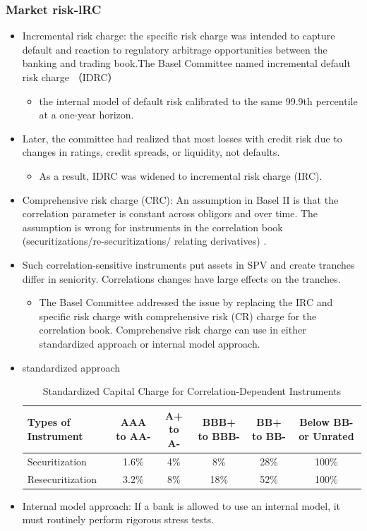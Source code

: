 \subsubsection{Market risk-lRC}
\begin{itemize}
\item Incremental risk charge: the specific risk charge was intended to capture default and reaction to regulatory arbitrage opportunities between the banking and trading book.The Basel Committee named incremental default risk charge （IDRC）

    \begin{itemize}
    \item the internal model of default risk calibrated to the same 99.9th percentile at a one-year horizon.
    \end{itemize}

\item Later, the committee had realized that most losses with credit risk due to changes in ratings, credit spreads, or liquidity, not defaults.
    \begin{itemize}
    \item As a result, IDRC was widened to incremental risk charge (IRC).
    \end{itemize}
    
\item Comprehensive risk charge (CRC): An assumption in Basel II is that the correlation parameter is constant across obligors and over time. The assumption is wrong for instruments in the correlation book (securitizations/re-securitizations/ relating derivatives) .
\item Such correlation-sensitive instruments put assets in SPV and create tranches differ in seniority. Correlations changes have large effects on the tranches.
    \begin{itemize}
    \item The Basel Committee addressed the issue by replacing the IRC and specific risk charge with comprehensive risk (CR) charge for the correlation book. Comprehensive risk charge can use in either standardized approach or internal model approach.
    \end{itemize}
\item standardized approach

\begin{table}[h]
    \centering
    \caption{Standardized Capital Charge for Correlation-Dependent Instruments}
    \begin{tabular}{|l|c|c|c|c|c|}
        \hline
        \textbf{Types of Instrument} & \textbf{AAA to AA-} & \textbf{A+ to A-} & \textbf{BBB+ to BBB-} & \textbf{BB+ to BB-} & \textbf{Below BB- or Unrated} \\
        \hline
        Securitization & 1.6\% & 4\% & 8\% & 28\% & 100\% \\
        \hline
        Resecuritization & 3.2\% & 8\% & 18\% & 52\% & 100\% \\
        \hline
    \end{tabular}
\end{table}
\item Internal model approach: If a bank is allowed to use an internal model, it must routinely perform rigorous stress tests.


\end{itemize}
